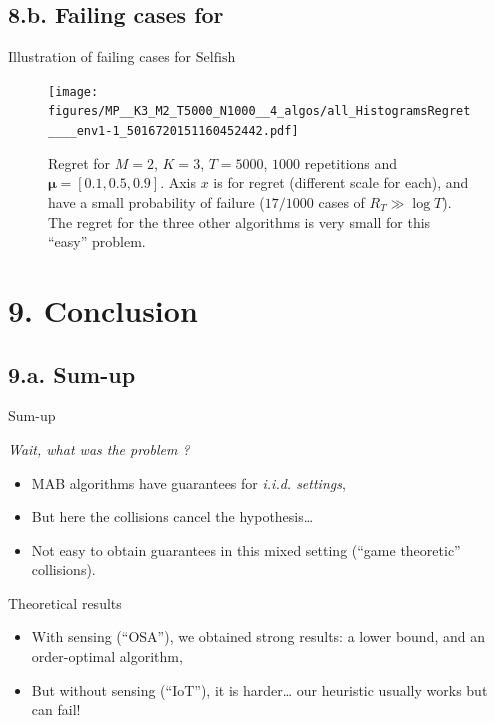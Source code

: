 \documentclass[12pt,english,ignorenonframetext,aspectratio=169,]{beamer}
\providecommand{\tightlist}{%
  \setlength{\itemsep}{0pt}\setlength{\parskip}{0pt}}
\begin{document}
\subsection{\hfill{}8.b. Failing cases for \Selfish\hfill{}}

\begin{frame}[plain]{Illustration of failing cases for
\(\mathrm{Selfish}\)}

\begin{figure}[h!]
\texttt{[image: figures/MP\_\_K3\_M2\_T5000\_N1000\_\_4\_algos/all\_HistogramsRegret\_\_\_\_env1-1\_5016720151160452442.pdf]}
\caption{\footnotesize{Regret for $M=2$, $K=3$, $T=5000$, $1000$ repetitions and $\boldsymbol{\mu} = [0.1, 0.5, 0.9]$. Axis $x$ is for regret (different scale for each), and \textcolor{bluegreen}{\Selfish{}} have a small probability of failure ($17/1000$ cases of $R_T \gg \log T$). The regret for the three other algorithms is very small for this ``easy'' problem.}}
\end{figure}

\end{frame}



\section{\hfill{}9. Conclusion\hfill{}}\subsection{\hfill{}9.a. Sum-up\hfill{}}

\begin{frame}{Sum-up}

\begin{block}{\emph{Wait, what was the problem ?}}

\begin{itemize}
\tightlist
\item
  MAB algorithms have guarantees for \emph{i.i.d. settings},
\item
  But here the collisions cancel the \iid{} hypothesis\ldots{}
\item
  Not easy to obtain guarantees in this mixed setting
  (``game theoretic'' collisions).
\end{itemize}

\pause

\end{block}

\begin{block}{Theoretical results}

\begin{itemize}
\tightlist
\item
  With sensing (``OSA''), we obtained strong results: a lower bound, and
  an order-optimal algorithm,
\item
  But without sensing (``IoT''), it is harder\ldots{} our heuristic
  \Selfish{} usually works but can fail!
\end{itemize}

\end{block}

\end{frame}
\end{document}
